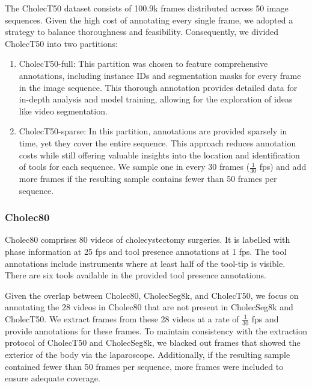 The CholecT50 dataset consists of 100.9k frames distributed across 50 image sequences. Given the high cost of annotating every single frame, we adopted a strategy to balance thoroughness and feasibility. Consequently, we divided CholecT50 into two partitions:
%
\begin{enumerate}
    \item CholecT50-full: This partition was chosen to feature comprehensive annotations, including instance IDs and segmentation masks for every frame in the image sequence. This thorough annotation provides detailed data for in-depth analysis and model training, allowing for the exploration of ideas like video segmentation.
    \item CholecT50-sparse: In this partition, annotations are provided sparsely in time, yet they cover the entire sequence. This approach reduces annotation costs while still offering valuable insights into the location and identification of tools for each sequence. We sample one in every 30 frames ($\frac{1}{30}$ fps) and add more frames if the resulting sample contains fewer than 50 frames per sequence.
\end{enumerate}


\subsubsection*{Cholec80}
Cholec80 comprises 80 videos of cholecystectomy surgeries. It is labelled with phase information at 25 fps and tool presence annotations at 1 fps. The tool annotations include instruments where at least half of the tool-tip is visible. There are six tools available in the provided tool presence annotations.

Given the overlap between Cholec80, CholecSeg8k, and CholecT50, we focus on annotating the 28 videos in Cholec80 that are not present in CholecSeg8k and CholecT50. We extract frames from these 28 videos at a rate of $\frac{1}{30}$ fps and provide annotations for these frames. 
To maintain consistency with the extraction protocol of CholecT50 and CholecSeg8k, we blacked out frames that showed the exterior of the body via the laparoscope. Additionally, if the resulting sample contained fewer than 50 frames per sequence, more frames were included to ensure adequate coverage.

